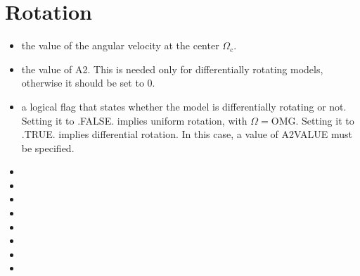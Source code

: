 \documentclass[letterpaper,10pt,english]{sphinxmanual}
\begin{document}
\section{Rotation}
\label{\detokenize{user_params:rotation}}
\sphinxAtStartPar
{}
\begin{itemize}
\item {} 
\sphinxAtStartPar
{} \sphinxhyphen{} the value of the angular velocity at the center \(\Omega _\mathrm{c}\).


\item {} 
\sphinxAtStartPar
{} \sphinxhyphen{} the value of A2. This is needed only for differentially rotating models, otherwise it should
be set to 0.


\item {} 
\sphinxAtStartPar
{} \sphinxhyphen{} a logical flag that states whether the model is differentially rotating or not. Setting it
to .FALSE. implies uniform rotation, with \(\Omega = \)OMG. Setting it to .TRUE. implies differential rotation.
In this case, a value of A2VALUE must be specified.


\item {} 
\sphinxAtStartPar
{} \sphinxhyphen{}


\item {} 
\sphinxAtStartPar
{} \sphinxhyphen{}


\item {} 
\sphinxAtStartPar
{} \sphinxhyphen{}


\item {} 
\sphinxAtStartPar
{} \sphinxhyphen{}


\item {} 
\sphinxAtStartPar
{} \sphinxhyphen{}


\item {} 
\sphinxAtStartPar
{} \sphinxhyphen{}


\item {} 
\sphinxAtStartPar
{} \sphinxhyphen{}


\item {} 
\sphinxAtStartPar
{} \sphinxhyphen{}

\end{itemize}
\end{document}
